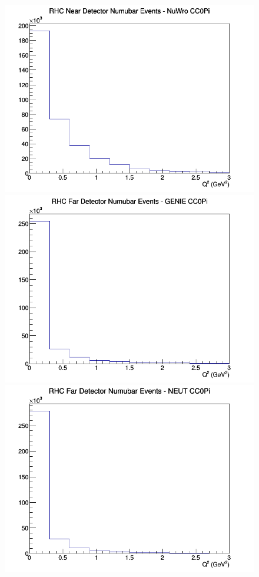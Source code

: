\documentclass[12pt]{article}
\begin{document}
\begin{figure}[h]
\includegraphics[width=\linewidth]{eff_Q2/FGT/CC0Pi_RHC_ND_numubar_Q2_NuWro.png}
\endminipage
\newline
{}
\includegraphics[width=\linewidth]{eff_Q2/FGT/CC0Pi_RHC_FD_numubar_Q2_GENIE.png}
\endminipage
{}
\includegraphics[width=\linewidth]{eff_Q2/FGT/CC0Pi_RHC_FD_numubar_Q2_NEUT.png}

\end{figure}
\end{document}
